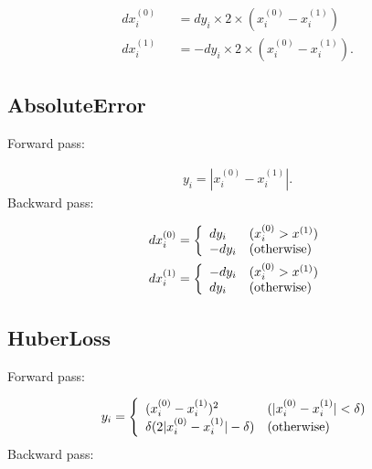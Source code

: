 \documentclass{article}
\begin{document}
\begin{eqnarray}
  dx^{(0)}_i &&= dy_i \times 2 \times \left(x^{(0)}_i - x^{(1)}_i\right) \\
  dx^{(1)}_i &&= -dy_i \times 2 \times \left(x^{(0)}_i - x^{(1)}_i\right).
\end{eqnarray}


\subsection{AbsoluteError}

Forward pass:

\begin{eqnarray}
  y_i = | x^{(0)}_i - x^{(1)}_i |.
\end{eqnarray}
%
Backward pass:

\begin{eqnarray}
  dx^{(0)}_i= \left\{
  \begin{array}{ll}
   dy_i  & (x^{(0)}_i > x^{(1)}) \\
   -dy_i & ({\rm otherwise})
  \end{array} \right. \\
  dx^{(1)}_i= \left\{
  \begin{array}{ll}
   -dy_i  & (x^{(0)}_i > x^{(1)}) \\
   dy_i & ({\rm otherwise})
  \end{array} \right.
\end{eqnarray}


\subsection{HuberLoss}

Forward pass:

\begin{eqnarray}
  y_i= \left\{
  \begin{array}{ll}
    (x^{(0)}_i - x^{(1)}_i)^2 & (|x^{(0)}_i - x^{(1)}_i| < \delta) \\
    \delta (2 |x^{(0)}_i - x^{(1)}_i| - \delta) & ({\rm otherwise})
  \end{array} \right.
\end{eqnarray}
%
Backward pass:
\end{document}
